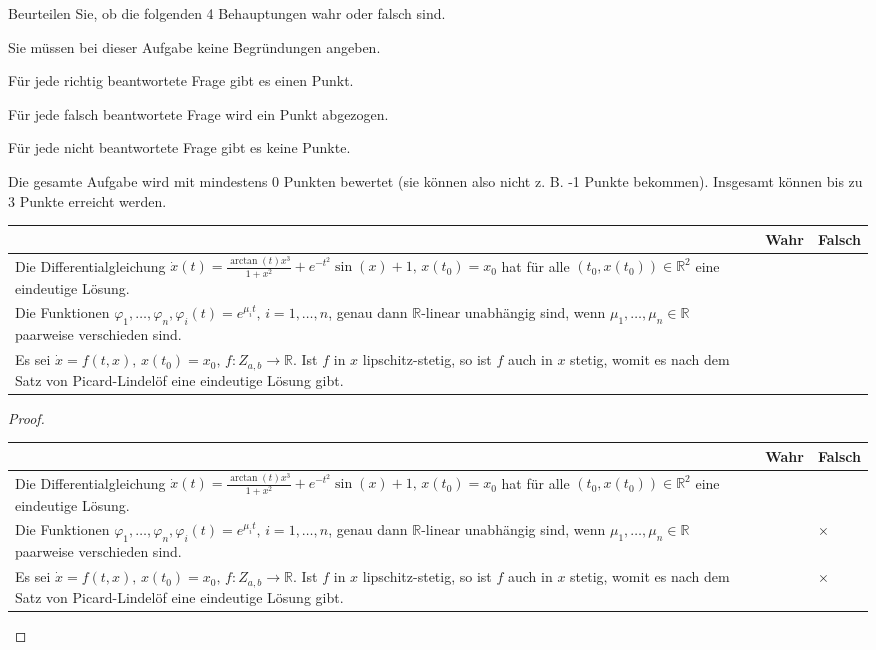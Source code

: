 \begin{Problem}
	Beurteilen Sie, ob die folgenden 4 Behauptungen wahr oder falsch sind.
	
	Sie müssen bei dieser Aufgabe keine Begründungen angeben.
	
	Für jede richtig beantwortete Frage gibt es einen Punkt.
	
	Für jede falsch beantwortete Frage wird ein Punkt abgezogen.
	
	Für jede nicht beantwortete Frage gibt es keine Punkte.
	
	Die gesamte Aufgabe wird mit mindestens 0 Punkten bewertet (sie können also nicht z. B. -1 Punkte bekommen). Insgesamt können bis zu 3 Punkte erreicht werden.
	
	\begin{tabularx}{\textwidth}{X|p{2cm}|p{2cm}|}
		& Wahr & Falsch \\\hline
		Die Differentialgleichung $\dot{x}(t) = \frac{\arctan(t)x^3}{1 + x^2} + e^{-t^2} \sin(x) + 1, \, x(t_0) = x_0$ hat für alle $(t_0, x(t_0)) \in \mathbb{R}^2$ eine eindeutige Lösung. & & \\\hline
	Die Funktionen $\varphi_1, \ldots, \varphi_n, \varphi_i(t) = e^{\mu_i t}, \, i = 1, \ldots, n$, genau dann $\mathbb{R}$-linear unabhängig sind, wenn $\mu_1, \ldots, \mu_n \in \mathbb{R}$ paarweise verschieden sind. & & \\\hline
		Es sei $\dot{x} = f(t, x), \, x(t_0) = x_0, \, f : Z_{a,b} \to \mathbb{R}$. Ist $f$ in $x$ lipschitz-stetig, so ist $f$ auch in $x$ stetig, womit es nach dem Satz von Picard-Lindelöf eine eindeutige Lösung gibt. & & \\\hline
	\end{tabularx}
\end{Problem}
\begin{proof}
		\begin{tabularx}{\textwidth}{X|p{2cm}|p{2cm}|}
		& Wahr & Falsch \\\hline
		Die Differentialgleichung $\dot{x}(t) = \frac{\arctan(t)x^3}{1 + x^2} + e^{-t^2} \sin(x) + 1, \, x(t_0) = x_0$ hat für alle $(t_0, x(t_0)) \in \mathbb{R}^2$ eine eindeutige Lösung. & & \\\hline
		Die Funktionen $\varphi_1, \ldots, \varphi_n, \varphi_i(t) = e^{\mu_i t}, \, i = 1, \ldots, n$, genau dann $\mathbb{R}$-linear unabhängig sind, wenn $\mu_1, \ldots, \mu_n \in \mathbb{R}$ paarweise verschieden sind. & & $\times$\\\hline
		Es sei $\dot{x} = f(t, x), \, x(t_0) = x_0, \, f : Z_{a,b} \to \mathbb{R}$. Ist $f$ in $x$ lipschitz-stetig, so ist $f$ auch in $x$ stetig, womit es nach dem Satz von Picard-Lindelöf eine eindeutige Lösung gibt. & & $\times$ \\\hline
	\end{tabularx}
\end{proof}